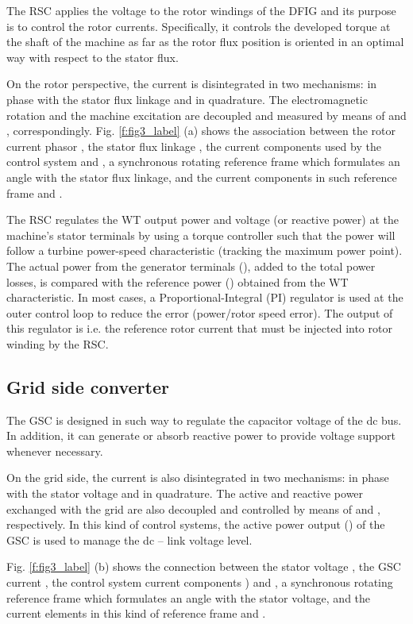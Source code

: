 \documentclass[conference,11pt]{IEEEtran}
\begin{document}
The RSC applies the voltage to the rotor windings of the DFIG and its purpose is to control the rotor currents. Specifically, it controls the developed torque at the shaft of the machine as far as the rotor flux position is oriented in an optimal way with respect to the stator flux.
 
On the rotor perspective, the current is disintegrated in two mechanisms:  in phase with the stator flux linkage and  in quadrature. The electromagnetic rotation and the machine excitation are decoupled and measured by means of  and , correspondingly. Fig. \ref{f:fig3_label} (a) shows the association between the rotor current phasor , the stator flux linkage , the current components used by the control system  and , a synchronous rotating reference frame  which formulates an angle  with the stator flux linkage, and the current components in such reference frame  and  \cite{ref10}.

The RSC regulates the WT output power and voltage (or reactive power) at the machine's stator terminals by using a torque controller such that the power will follow a turbine power-speed characteristic (tracking the maximum power point). The actual power from the generator terminals (),  added to the total power losses, is compared with the reference power () obtained from the WT characteristic. In most cases, a Proportional-Integral (PI) regulator is used at the outer control loop to reduce the error (power/rotor speed error). The output of this regulator is  i.e. the reference rotor current that must be injected into rotor winding by the RSC. 

\subsection{Grid side converter}

The GSC is designed in such way to regulate the capacitor voltage of the dc bus. In addition, it can generate or absorb reactive power to provide voltage support whenever necessary. 

On the grid side, the current is also disintegrated in two mechanisms:  in phase with the stator voltage and  in quadrature. The active and reactive power exchanged with the grid are also decoupled and controlled by means of  and , respectively. In this kind of control systems, the active power output () of the GSC is used to manage the dc – link voltage level. 

Fig. \ref{f:fig3_label} (b) shows the connection between the stator voltage , the GSC current , the control system current components ) and , a synchronous rotating reference frame  which formulates an angle  with the stator voltage, and the current elements in this kind of reference frame  and  \cite{ref10}. 
\end{document}
